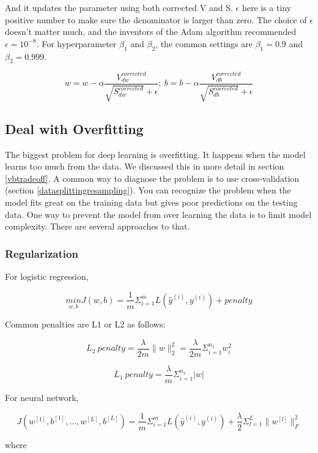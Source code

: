 \documentclass[
  12pt,
]{krantz}
\begin{document}
And it updates the parameter using both corrected V and S. \(\epsilon\) here is a tiny positive number to make sure the denominator is larger than zero. The choice of \(\epsilon\) doesn't matter much, and the inventors of the Adam algorithm recommended \(\epsilon = 10^{-8}\). For hyperparameter \(\beta_1\) and \(\beta_2\), the common settings are \(\beta_1 = 0.9\) and \(\beta_2 = 0.999\).

\[w=w-\alpha \frac{V_{dw}^{corrected}}{\sqrt{S_{dw}^{corrected}} +\epsilon};\ b=b-\alpha\frac{V_{db}^{corrected}}{\sqrt{S_{db}^{corrected}}+\epsilon}\]

\hypertarget{deal-with-overfitting}{%
\subsection{Deal with Overfitting}\label{deal-with-overfitting}}

The biggest problem for deep learning is overfitting. It happens when the model learns too much from the data. We discussed this in more detail in section \ref{vbtradeoff}. A common way to diagnose the problem is to use cross-validation (section \ref{datasplittingresampling}). You can recognize the problem when the model fits great on the training data but gives poor predictions on the testing data. One way to prevent the model from over learning the data is to limit model complexity. There are several approaches to that.

\hypertarget{regularization}{%
\subsubsection{Regularization}\label{regularization}}

For logistic regression,

\[\underset{w,b}{min}J(w,b)= \frac{1}{m} \Sigma_{i=1}^{m}L(\hat{y}^{(i)}, y^{(i)}) + penalty\]

Common penalties are L1 or L2 as follows:

\[L_2\ penalty=\frac{\lambda}{2m}\parallel w \parallel_2^2 = \frac{\lambda}{2m}\Sigma_{i=1}^{n_x}w_i^2\]

\[L_1\ penalty = \frac{\lambda}{m}\Sigma_{i=1}^{n_x}|w|\]

For neural network,

\[J(w^{[1]},b^{[1]},\dots,w^{[L]},b^{[L]})=\frac{1}{m}\Sigma_{i=1}^{m}L(\hat{y}^{(i)},y^{(i)}) + \frac{\lambda}{2}\Sigma_{l=1}^{L} \parallel w^{[l]} \parallel^2_F\]

where
\end{document}
